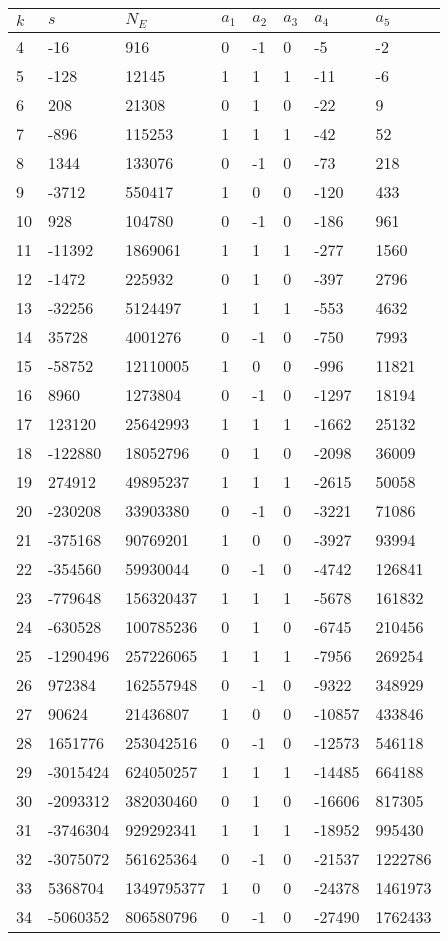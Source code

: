 \documentclass{amsart}
\begin{document}
\begin{longtable}{|l|l|l|lllll|}
\hline
$k$ & $s$ & $N_E$ & $a_1$ & $a_2$ & $a_3$ & $a_4$ & $a_5$\\
\hline
4&-16&916&0&-1&0&-5&-2\\
5&-128&12145&1&1&1&-11&-6\\
6&208&21308&0&1&0&-22&9\\
7&-896&115253&1&1&1&-42&52\\
8&1344&133076&0&-1&0&-73&218\\
9&-3712&550417&1&0&0&-120&433\\
10&928&104780&0&-1&0&-186&961\\
11&-11392&1869061&1&1&1&-277&1560\\
12&-1472&225932&0&1&0&-397&2796\\
13&-32256&5124497&1&1&1&-553&4632\\
14&35728&4001276&0&-1&0&-750&7993\\
15&-58752&12110005&1&0&0&-996&11821\\
16&8960&1273804&0&-1&0&-1297&18194\\
17&123120&25642993&1&1&1&-1662&25132\\
18&-122880&18052796&0&1&0&-2098&36009\\
19&274912&49895237&1&1&1&-2615&50058\\
20&-230208&33903380&0&-1&0&-3221&71086\\
21&-375168&90769201&1&0&0&-3927&93994\\
22&-354560&59930044&0&-1&0&-4742&126841\\
23&-779648&156320437&1&1&1&-5678&161832\\
24&-630528&100785236&0&1&0&-6745&210456\\
25&-1290496&257226065&1&1&1&-7956&269254\\
26&972384&162557948&0&-1&0&-9322&348929\\
27&90624&21436807&1&0&0&-10857&433846\\
28&1651776&253042516&0&-1&0&-12573&546118\\
29&-3015424&624050257&1&1&1&-14485&664188\\
30&-2093312&382030460&0&1&0&-16606&817305\\
31&-3746304&929292341&1&1&1&-18952&995430\\
32&-3075072&561625364&0&-1&0&-21537&1222786\\
33&5368704&1349795377&1&0&0&-24378&1461973\\
34&-5060352&806580796&0&-1&0&-27490&1762433\\

\end{longtable}
\end{document}
